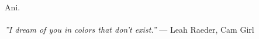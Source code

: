 \thispagestyle{empty}\mbox{}{\textheight}\mbox{}\hfill\begin{minipage}{0.55\textwidth}%

Ani.\\\\
\textit{''I dream of you in colors that don't exist.''}
\flushright --- Leah Raeder, Cam Girl
\normalfont\end{minipage}